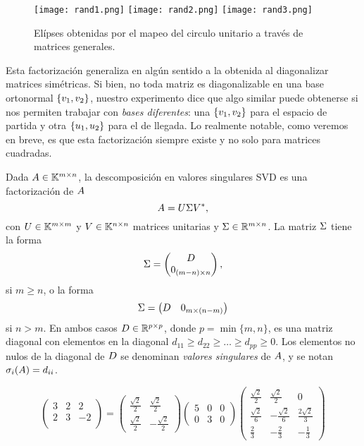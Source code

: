 \begin{figure}\label{fig:expgral}
\texttt{[image: rand1.png]}
\texttt{[image: rand2.png]}
\texttt{[image: rand3.png]}
\caption{Elípses obtenidas por el mapeo del circulo unitario a través de matrices generales.}
\end{figure}

\tcc
Esta factorización generaliza en algún sentido a la obtenida al diagonalizar matrices simétricas. Si bien, no toda matriz es diagonalizable en una base ortonormal $\{\vb_1,\vb_2\}$, nuestro experimento dice que algo similar puede obtenerse si nos permiten trabajar con \emph{bases diferentes}: una $\{\vb_1,\vb_2\}$ para el espacio de partida y otra $\{\ub_1,\ub_2\}$ para el de llegada.
\etcc
Lo realmente notable, como veremos en breve, es que esta factorización siempre existe y no solo para matrices cuadradas.
\begin{definicion}
Dada $\Ab \in \K^{m \times n}$, la descomposición en valores singulares SVD es una factorización de $\Ab$
$$\Ab = \Ub \Sigmab \Vb^*,$$
con $\Ub \in \K^{m \times m}$ y $\Vb \in \K^{n \times n}$
matrices unitarias y  $\Sigmab \in \R^{m \times n}$. La matriz $\Sigmab$ tiene la forma
$$
\Sigmab = \begin{pmatrix} \Db \\ \cero_{(m-n) \times n}\end{pmatrix},
$$
si $m \ge n$, o la forma
$$\Sigmab = \begin{pmatrix} \Db & \cero_{m \times (n-m)} \end{pmatrix}$$
si $n > m$. En ambos casos $\Db \in \mathbb{R}^{p \times p}$, donde $p=\min \{m,n\}$, es una matriz diagonal con elementos en
la diagonal $d_{11} \ge d_{22} \ge \dots \ge d_{pp} \ge 0$.
Los elementos no nulos de la diagonal de $\Db$ se denominan \emph{valores singulares} de
$\Ab$, y se notan $\sigma_i(\Ab) = d_{ii}$.
 \end{definicion}

\begin{ejemplo}
$$
\begin{pmatrix}
3 & 2 & 2 \\
2 & 3 & -2 \\
\end{pmatrix} = \begin{pmatrix}
\frac{\sqrt2}{2} & \frac{\sqrt2}{2} \\
\frac{\sqrt2}{2} & -\frac{\sqrt2}{2}
\end{pmatrix} \begin{pmatrix}
5 & 0 & 0 \\
0 & 3 & 0
\end{pmatrix}
\begin{pmatrix}
\frac{\sqrt2}{2} & \frac{\sqrt2}{2} & 0 \\
\frac{\sqrt2}{6} & -\frac{\sqrt2}{6} & \frac{2\sqrt2}{3} \\
\frac23 & -\frac23 & -\frac13
\end{pmatrix}
$$
\end{ejemplo}

